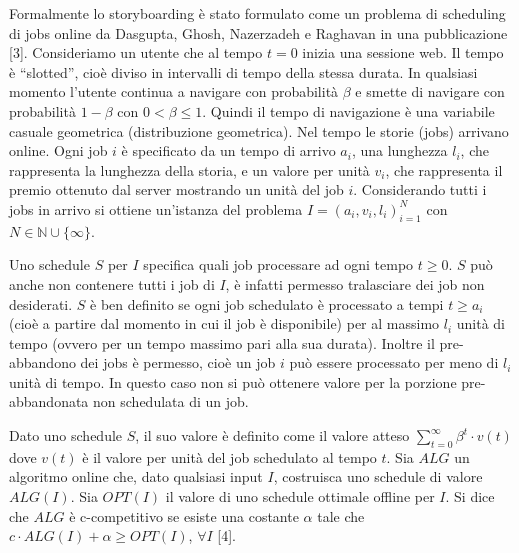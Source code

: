 \documentclass[twoside,openany,titlepage,fleqn,
	headinclude,12pt,a4paper,BCOR5mm,footinclude]{scrbook}
\newcommand*{\N}{\mathbb{N}}
\begin{document}
Formalmente lo storyboarding è stato formulato come un problema di scheduling di jobs online da Dasgupta, Ghosh, Nazerzadeh e Raghavan in una pubblicazione [3]. Consideriamo un utente che al tempo $t = 0$ inizia una sessione web. Il tempo è “slotted”, cioè diviso in intervalli di tempo della stessa durata. In qualsiasi momento l’utente continua a navigare con probabilità $\beta$ e smette di navigare con probabilità $1 - \beta$ con $0 < \beta \leq 1$. Quindi il tempo di navigazione è una variabile casuale geometrica (distribuzione geometrica). Nel tempo le storie (jobs) arrivano online. Ogni job $i$ è specificato da un tempo di arrivo $a_{i}$, una lunghezza $l_{i}$, che rappresenta la lunghezza della storia, e un valore per unità $v_{i}$, che rappresenta il premio ottenuto dal server mostrando un unità del job $i$. Considerando tutti i jobs in arrivo si ottiene un'istanza del problema $I = (a_{i}, v_{i}, l_{i})_{i=1}^{N}$ con  $N \in \N \cup \{ \infty \}$.

Uno schedule $S$ per $I$ specifica quali job processare ad ogni tempo $t \geq 0$. $S$ può anche non contenere tutti i job di $I$, è infatti permesso tralasciare dei job non desiderati. $S$ è ben definito se ogni job schedulato è processato a tempi $t \geq a_{i}$ (cioè a partire dal momento in cui il job è disponibile) per al massimo $l_{i}$ unità di tempo (ovvero per un tempo massimo pari alla sua durata). Inoltre il pre-abbandono dei jobs è permesso, cioè un job $i$ può essere processato per meno di $l_{i}$ unità di tempo. In questo caso non si può ottenere valore per la porzione pre-abbandonata non schedulata di un job. 

Dato uno schedule $S$, il suo valore è definito come il valore atteso $\sum_{t=0}^{\infty} \beta^{t}\cdot v(t)$ dove $v(t)$ è il valore per unità del job schedulato al tempo $t$. Sia $ALG$ un algoritmo online che, dato qualsiasi input $I$, costruisca uno schedule di valore $ALG(I)$. Sia $OPT(I)$ il valore di uno schedule ottimale offline per $I$. Si dice che $ALG$ è c-competitivo se esiste una costante $\alpha$ tale che $c \cdot ALG(I) + \alpha \geq OPT(I)$, $\forall I$ [4].
\end{document}
